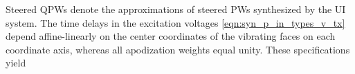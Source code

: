 Steered \acp{QPW} denote
the approximations of
steered \acp{PW} synthesized by
the \ac{UI} system.
The time delays in
the excitation voltages
\eqref{eqn:syn_p_in_types_v_tx} depend affine-linearly on
the center coordinates of
the vibrating faces on
each coordinate axis, whereas
all apodization weights equal
unity.
These specifications yield
